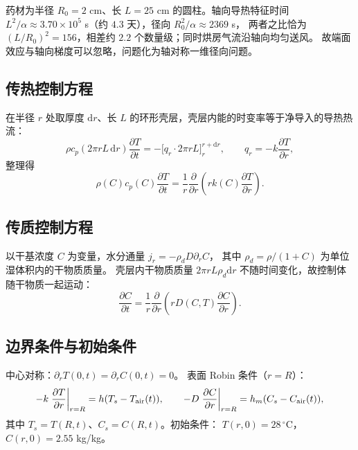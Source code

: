 \documentclass[bwprint]{cumcmthesis}
\begin{document}
药材为半径 $R_0=2$ cm、长 $L=25$ cm 的圆柱。轴向导热特征时间
$L^2/\alpha\approx3.70\times10^5$ s（约 $4.3$ 天），径向 $R_0^2/\alpha\approx2369$ s，
两者之比恰为 $(L/R_0)^2=156$，相差约 $2.2$ 个数量级；同时烘房气流沿轴向均匀送风。
故端面效应与轴向梯度可以忽略，问题化为轴对称一维径向问题。

\subsection{传热控制方程}

在半径 $r$ 处取厚度 $\mathrm{d}r$、长 $L$ 的环形壳层，壳层内能的时变率等于净导入的导热热流：
\begin{equation}
\rho c_p(2\pi rL\,\mathrm{d}r)\frac{\partial T}{\partial t}
=-\big[q_r\cdot2\pi rL\big]_r^{r+\mathrm{d}r},\qquad q_r=-k\frac{\partial T}{\partial r},
\end{equation}
整理得
\begin{equation}
\rho(C)c_p(C)\frac{\partial T}{\partial t}
=\frac{1}{r}\frac{\partial}{\partial r}\left(rk(C)\frac{\partial T}{\partial r}\right).
\label{eq:energy}
\end{equation}

\subsection{传质控制方程}

以干基浓度 $C$ 为变量，水分通量 $j_r=-\rho_dD\partial_rC$，
其中 $\rho_d=\rho/(1+C)$ 为单位湿体积内的干物质质量。
壳层内干物质质量 $2\pi rL\rho_d\mathrm{d}r$ 不随时间变化，故控制体随干物质一起运动：
\begin{equation}
\frac{\partial C}{\partial t}
=\frac{1}{r}\frac{\partial}{\partial r}\left(rD(C,T)\frac{\partial C}{\partial r}\right).
\label{eq:mass}
\end{equation}

\subsection{边界条件与初始条件}

中心对称：$\partial_rT(0,t)=\partial_rC(0,t)=0$。
表面 Robin 条件（$r=R$）：
\begin{equation}
-k\left.\frac{\partial T}{\partial r}\right|_{r=R}=h(T_s-T_{\rm air}(t)),
\qquad
-D\left.\frac{\partial C}{\partial r}\right|_{r=R}=h_m(C_s-C_{\rm air}(t)),
\label{eq:robin}
\end{equation}
其中 $T_s=T(R,t)$、$C_s=C(R,t)$。初始条件：
$T(r,0)=28\,^\circ$C，$C(r,0)=2.55$ kg/kg。
\end{document}
